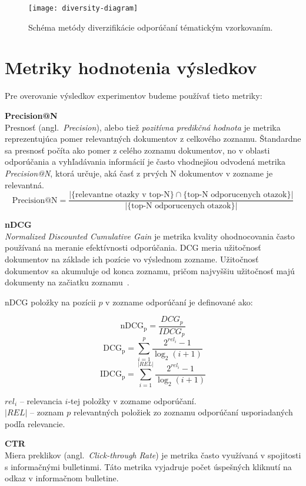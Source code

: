 \begin{figure}[H]\begin{center}
\texttt{[image: diversity-diagram]}
\caption{Schéma metódy diverzifikácie odporúčaní tématickým vzorkovaním.\label{fig:tematic-sampling}}\end{center}
\end{figure}


\section{Metriky hodnotenia výsledkov}

Pre overovanie výsledkov experimentov budeme používať tieto metriky:

\textbf{Precision@N}\\
Presnosť (angl.~\emph{Precision}), alebo tiež \textit{pozitívna predikčná hodnota} je metrika reprezentujúca pomer relevantných
dokumentov z celkového zoznamu. Štandardne sa presnosť počíta ako pomer z celého zoznamu dokumentov, no v oblasti
odporúčania a vyhľadávania informácií je často vhodnejšou odvodená metrika \textit{Precision@N}, ktorá určuje, aká časť
z prvých N dokumentov v zozname je relevantná.
$$\mbox{Precision@N}=\frac{|\{\mbox{relevantne otazky v top-N}\}\cap\{\mbox{top-N odporucenych otazok}\}|}{|\{\mbox{top-N odporucenych otazok}\}|}$$

\textbf{nDCG}\\
\textit{Normalized Discounted Cumulative Gain} je metrika kvality ohodnocovania často používaná na meranie efektívnosti
odporúčania. DCG meria užitočnosť dokumentov na základe ich pozície vo výslednom zozname. Užitočnosť dokumentov sa akumuluje
od konca zoznamu, pričom najvyššiu užitočnosť majú dokumenty na začiatku zoznamu~\cite{Jrvelin2002}.

nDCG položky na pozícii $p$ v zozname odporúčaní je definované ako:

$$\mathrm{nDCG_{p}} = \frac{DCG_{p}}{IDCG_{p}}$$
$$\mathrm{DCG_{p}} = \sum_{i=1}^{p} \frac{ 2^{rel_{i}} - 1 }{ \log_{2}(i+1)}$$
$$\mathrm{IDCG_{p}} = \sum_{i=1}^{|REL|} \frac{ 2^{rel_{i}} - 1 }{ \log_{2}(i+1)}$$
\begin{adjustwidth}{1cm}{1cm}
$rel_i$ -- relevancia $i$-tej položky v zozname odporúčaní.\\
$|REL|$ -- zoznam $p$ relevantných položiek zo zoznamu odporúčaní usporiadaných podľa relevancie.
\end{adjustwidth}

\textbf{CTR}\\
Miera preklikov (angl.~\emph{Click-through Rate}) je metrika často využívaná v spojitosti s informačnými bulletinmi.
Táto metrika vyjadruje počet úspešných kliknutí na odkaz v informačnom bulletine.

